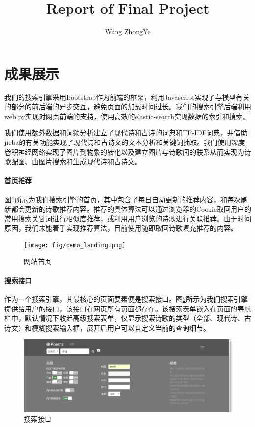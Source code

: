 \documentclass[a4paper, 10pt]{article}
\title{Report of Final Project}
\author{Wang ZhongYe}
\begin{document}
\maketitle

\section{成果展示}
我们的搜索引擎采用Bootstrap作为前端的框架，利用Javascript实现了与模型有关的部分的前后端的异步交互，避免页面的加载时间过长。我们的搜索引擎后端利用web.py实现对网页前端的支持，使用高效的elastic-search实现数据的索引和搜索。

我们使用额外数据和词频分析建立了现代诗和古诗的词典和TF-IDF词典，并借助jieba的有关功能实现了现代诗和古诗文的文本分析和关键词抽取。我们使用深度卷积神经网络实现了图片到物象的转化以及建立图片与诗歌间的联系从而实现为诗歌配图、由图片搜索和生成现代诗和古诗文。

\paragraph*{首页推荐} 图\ref{fig:demo_landing}所示为我们搜索引擎的首页，其中包含了每日自动更新的推荐内容，和每次刷新都会更新的诗歌推荐内容。推荐的具体算法可以通过浏览器的Cookie取回用户的常用搜索关键词进行相似度推荐，或利用用户浏览的诗歌进行关联推荐。由于时间原因，我们未能着手实现推荐算法，目前使用随即取回诗歌填充推荐的内容。

\begin{figure}[H]
\centering
\texttt{[image: fig/demo\_landing.png]}
\caption{网站首页}
\label{fig:demo_landing}
\end{figure}

\paragraph*{搜索接口} 作为一个搜索引擎，其最核心的页面要素便是搜索接口。图\ref{fig:demo_searchbar}所示为我们搜索引擎提供给用户的接口，该接口在网页所有页面都存在。该搜索表单嵌入在页面的导航栏中，默认情况下收起高级搜索表单，仅显示搜索诗歌的类型（全部、现代诗、古诗文）和模糊搜索输入框，展开后用户可以自定义当前的查询细节。

\begin{figure}[H]
\centering
\includegraphics[scale=0.5]{fig/demo_searchbar.png}
\caption{搜索接口}
\label{fig:demo_searchbar}
\end{figure}
\end{document}
